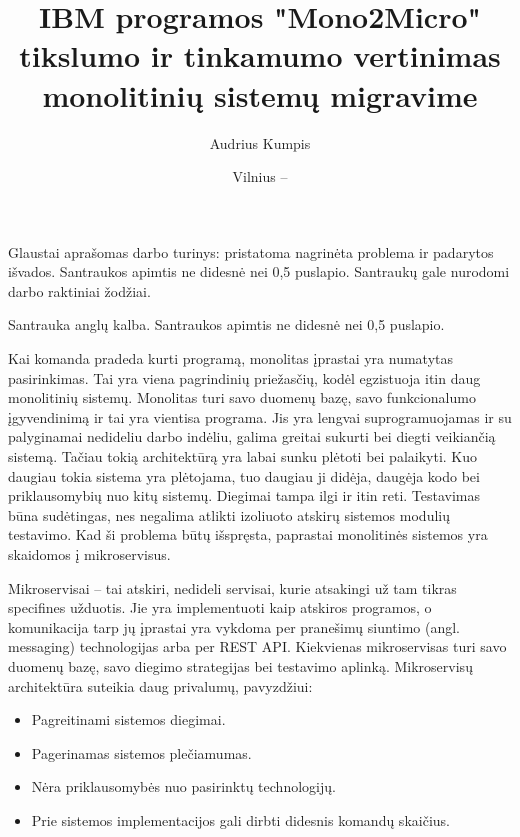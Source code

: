 \documentclass{VUMIFPSbakalaurinis}
\institute{Informatikos institutas}  %
\title{IBM programos "Mono2Micro" tikslumo ir tinkamumo vertinimas monolitinių sistemų migravime}
\author{Audrius Kumpis}
\date{Vilnius – \the\year}
\begin{document}
\maketitle

Glaustai aprašomas darbo turinys: pristatoma nagrinėta problema ir padarytos
išvados. Santraukos apimtis ne didesnė nei 0,5 puslapio. Santraukų gale
nurodomi darbo raktiniai žodžiai.

Santrauka anglų kalba. Santraukos apimtis ne didesnė nei 0,5 puslapio.


\tableofcontents

Kai komanda pradeda kurti programą, monolitas įprastai yra numatytas pasirinkimas. Tai yra viena pagrindinių priežasčių, kodėl egzistuoja itin daug monolitinių sistemų. Monolitas turi savo duomenų bazę, savo funkcionalumo įgyvendinimą ir tai yra vientisa programa. Jis yra lengvai suprogramuojamas ir su palyginamai nedideliu darbo indėliu, galima greitai sukurti bei diegti veikiančią sistemą. Tačiau tokią architektūrą yra labai sunku plėtoti bei palaikyti. Kuo daugiau  tokia sistema yra plėtojama, tuo daugiau ji didėja, daugėja kodo bei priklausomybių nuo kitų sistemų. Diegimai tampa ilgi ir itin reti. Testavimas būna sudėtingas, nes negalima atlikti izoliuoto atskirų sistemos modulių testavimo. Kad ši problema būtų išspręsta, paprastai monolitinės sistemos yra skaidomos į mikroservisus.

Mikroservisai – tai atskiri, nedideli servisai, kurie atsakingi už tam tikras specifines užduotis. Jie yra implementuoti kaip atskiros programos, o komunikacija tarp jų įprastai yra vykdoma per pranešimų siuntimo (angl. messaging) technologijas arba per REST API. Kiekvienas mikroservisas turi savo duomenų bazę, savo diegimo strategijas bei testavimo aplinką. Mikroservisų architektūra suteikia daug privalumų, pavyzdžiui:
\begin{itemize}
    \item Pagreitinami sistemos diegimai.
    \item Pagerinamas sistemos plečiamumas.
    \item Nėra priklausomybės nuo pasirinktų technologijų.
    \item Prie sistemos implementacijos gali dirbti didesnis komandų skaičius.
\end{itemize}
\end{document}
